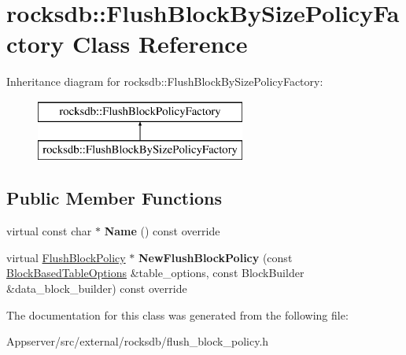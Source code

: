 \hypertarget{classrocksdb_1_1FlushBlockBySizePolicyFactory}{}\section{rocksdb\+:\+:Flush\+Block\+By\+Size\+Policy\+Factory Class Reference}
\label{classrocksdb_1_1FlushBlockBySizePolicyFactory}
Inheritance diagram for rocksdb\+:\+:Flush\+Block\+By\+Size\+Policy\+Factory\+:\begin{figure}[H]
\begin{center}
\leavevmode
\includegraphics[height=2.000000cm]{classrocksdb_1_1FlushBlockBySizePolicyFactory}
\end{center}
\end{figure}
\subsection*{Public Member Functions}
\begin{DoxyCompactItemize}
\item 
virtual const char $\ast$ {\bfseries Name} () const override\hypertarget{classrocksdb_1_1FlushBlockBySizePolicyFactory_a09a206a61a35e976089c479c1af12f1f}{}\label{classrocksdb_1_1FlushBlockBySizePolicyFactory_a09a206a61a35e976089c479c1af12f1f}

\item 
virtual \hyperlink{classrocksdb_1_1FlushBlockPolicy}{Flush\+Block\+Policy} $\ast$ {\bfseries New\+Flush\+Block\+Policy} (const \hyperlink{structrocksdb_1_1BlockBasedTableOptions}{Block\+Based\+Table\+Options} \&table\+\_\+options, const Block\+Builder \&data\+\_\+block\+\_\+builder) const override\hypertarget{classrocksdb_1_1FlushBlockBySizePolicyFactory_aa4371099b2479df6259e2074f124434b}{}\label{classrocksdb_1_1FlushBlockBySizePolicyFactory_aa4371099b2479df6259e2074f124434b}

\end{DoxyCompactItemize}


The documentation for this class was generated from the following file\+:\begin{DoxyCompactItemize}
\item 
Appserver/src/external/rocksdb/flush\+\_\+block\+\_\+policy.\+h\end{DoxyCompactItemize}
